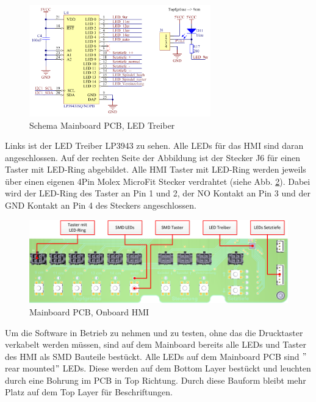 \begin{figure}[H]
	\includegraphics[width=0.7\textwidth]{Illustrationen/6-Umsetzung/Schema_Mainboard_LP39431.png}
	\caption{Schema Mainboard PCB, LED Treiber}
	\label{fig:Mainboard_LED_Driver_LP3943}
\end{figure}

Links ist der LED Treiber LP3943 zu sehen. Alle LEDs für das HMI sind daran angeschlossen. Auf der rechten Seite der Abbildung ist der Stecker J6 für einen Taster mit LED-Ring abgebildet. Alle HMI Taster mit LED-Ring werden jeweils über einen eigenen 4Pin Molex MicroFit Stecker verdrahtet (siehe Abb. \ref{fig:Mainboard_HMI_Layout}). Dabei wird der LED-Ring des Taster an Pin 1 und 2, der NO Kontakt an Pin 3 und der GND Kontakt an Pin 4 des Steckers angeschlossen.

\begin{figure}[H]
	\includegraphics[width=1\textwidth]{Illustrationen/6-Umsetzung/HMI_Layout.png}
	\caption{Mainboard PCB, Onboard HMI}
	\label{fig:Mainboard_HMI_Layout}
\end{figure}

 Um die Software in Betrieb zu nehmen und zu testen, ohne das die Drucktaster verkabelt werden müssen, sind auf dem Mainboard bereits alle LEDs und Taster des HMI als SMD Bauteile bestückt. Alle LEDs auf dem Mainboard PCB sind $"$rear mounted$"$ LEDs. Diese werden auf dem Bottom Layer bestückt und leuchten durch eine Bohrung im PCB in Top Richtung. Durch diese Bauform bleibt mehr Platz auf dem Top Layer für Beschriftungen.




